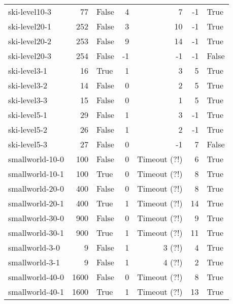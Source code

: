 \begin{longtable}{lrlrrrl}
ski-level10-3 & 77 & False & 4 & 7 & -1 & True \\

ski-level20-1 & 252 & False & 3 & 10 & -1 & True \\

ski-level20-2 & 253 & False & 9 & 14 & -1 & True \\

ski-level20-3 & 254 & False & -1 & -1 & -1 & False \\

ski-level3-1 & 16 & True & 1 & 3 & 5 & True \\

ski-level3-2 & 14 & False & 0 & 2 & 5 & True \\

ski-level3-3 & 15 & False & 0 & 1 & 5 & True \\

ski-level5-1 & 29 & False & 1 & 3 & -1 & True \\

ski-level5-2 & 26 & False & 1 & 2 & -1 & True \\

ski-level5-3 & 27 & False & 0 & -1 & 7 & False \\

smallworld-10-0 & 100 & False & 0 & Timeout (?!) & 6 & True \\

smallworld-10-1 & 100 & True & 0 & Timeout (?!) & 8 & True \\

smallworld-20-0 & 400 & False & 0 & Timeout (?!) & 8 & True \\

smallworld-20-1 & 400 & True & 1 & Timeout (?!) & 14 & True \\

smallworld-30-0 & 900 & False & 0 & Timeout (?!) & 9 & True \\

smallworld-30-1 & 900 & True & 1 & Timeout (?!) & 11 & True \\

smallworld-3-0 & 9 & False & 1 & 3 (?!) & 4 & True \\

smallworld-3-1 & 9 & False & 1 & 4 (?!) & 2 & True \\

smallworld-40-0 & 1600 & False & 0 & Timeout (?!) & 8 & True \\

smallworld-40-1 & 1600 & True & 1 & Timeout (?!) & 13 & True \\


\end{longtable}
